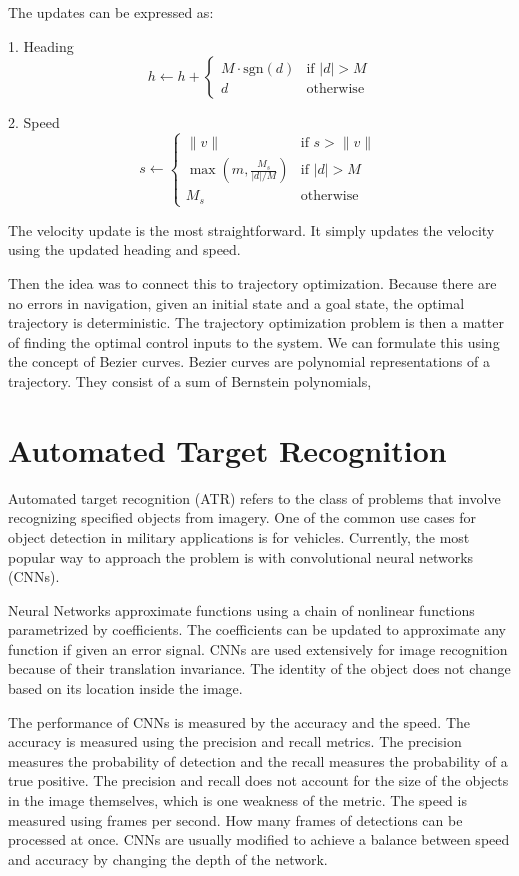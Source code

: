 \documentclass[12pt]{article}
\begin{document}
The updates can be expressed as:

1. Heading
\[
h \leftarrow h + 
\begin{cases} 
M \cdot \text{sgn}(d) & \text{if } |d| > M \\
d & \text{otherwise}
\end{cases}
\]

2. Speed
\[
s \leftarrow 
\begin{cases} 
\|v\| & \text{if } s > \|v\| \\
\max\left(m, \frac{M_s}{|d| / M}\right) & \text{if } |d| > M \\
M_s & \text{otherwise}
\end{cases}
\]

The velocity update is the most straightforward. It simply updates the velocity using the updated heading and speed. 

Then the idea was to connect this to trajectory optimization. Because there are no errors in navigation, given an initial state and a goal state, the optimal trajectory is deterministic. The trajectory optimization problem is then a matter of finding the optimal control inputs to the system. We can formulate this using the concept of Bezier curves. Bezier curves are polynomial representations of a trajectory. They consist of a sum of Bernstein polynomials, 
\section{Automated Target Recognition}
Automated target recognition (ATR) refers to the class of problems that involve recognizing specified objects from imagery. One of the common use cases for object detection in military applications is for vehicles. Currently, the most popular way to approach the problem is with convolutional neural networks (CNNs).

Neural Networks approximate functions using a chain of nonlinear functions parametrized by coefficients. The coefficients can be updated to approximate any function if given an error signal. CNNs are used extensively for image recognition because of their translation invariance. The identity of the object does not change based on its location inside the image. 

The performance of CNNs is measured by the accuracy and the speed. The accuracy is measured using the precision and recall metrics. The precision measures the probability of detection and the recall measures the probability of a true positive. The precision and recall does not account for the size of the objects in the image themselves, which is one weakness of the metric. The speed is measured using frames per second. How many frames of detections can be processed at once. CNNs are usually modified to achieve a balance between speed and accuracy by changing the depth of the network.
\end{document}
